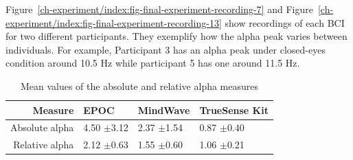 \documentclass[a4paper,10pt,english,lof,lot,twoside]{puthesis}
\begin{document}
Figure \ref{ch-experiment/index:fig-final-experiment-recording-7} and
Figure \ref{ch-experiment/index:fig-final-experiment-recording-13} show recordings of each
BCI for two different participants. They exemplify how the alpha peak varies
between individuals. For example, Participant 3 has an alpha peak under
closed-eyes condition around 10.5 Hz while participant 5 has one around 11.5 Hz.


\begin{table}
\capstart
\begin{center}

\begin{tabular}{r l l l}

\toprule
\textsf{\relax 
Measure
} & \textsf{\relax 
EPOC
} & \textsf{\relax 
MindWave
} & \textsf{\relax 
TrueSense Kit
}\\
\hline\midrule

Absolute alpha
 & 
4.50 \(\pm\)3.12
 & 
2.37 \(\pm\)1.54
 & 
0.87 \(\pm\)0.40
\\

Relative alpha
 & 
2.12 \(\pm\)0.63
 & 
1.55 \(\pm\)0.60
 & 
1.06 \(\pm\)0.21
\\
\hline\bottomrule

\end{tabular}
\caption[alpha measurement ability result]{Mean values of the absolute and relative alpha measures}\label{ch-experiment/index:table-experiment-final-result-mean}
\end{center}
\end{table}
\end{document}
